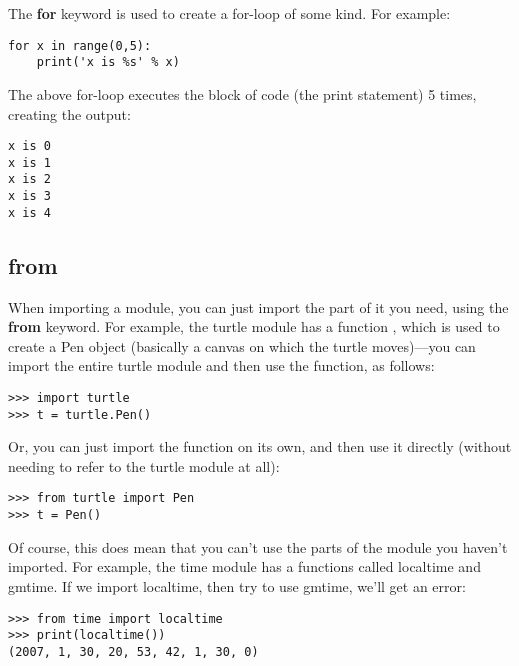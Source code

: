 The \textbf{for} keyword is used to create a for-loop of some kind. For example:

\begin{Verbatim}[frame=single]
for x in range(0,5):
    print('x is %s' % x)
\end{Verbatim}

\noindent
The above for-loop executes the block of code (the print statement) 5 times, creating the output:

\begin{Verbatim}[frame=single]
x is 0
x is 1
x is 2
x is 3
x is 4
\end{Verbatim}

\subsection*{from}

When importing a module, you can just import the part of it you need, using the \textbf{from} keyword. For example, the turtle module has a function , which is used to create a Pen object (basically a canvas on which the turtle moves)---you can import the entire turtle module and then use the  function, as follows:

\begin{Verbatim}[frame=single]
>>> import turtle
>>> t = turtle.Pen()
\end{Verbatim}

Or, you can just import the  function on its own, and then use it directly (without needing to refer to the turtle module at all):

\begin{Verbatim}[frame=single]
>>> from turtle import Pen
>>> t = Pen()
\end{Verbatim}

Of course, this does mean that you can't use the parts of the module you haven't imported.  For example, the time module has a functions called localtime and gmtime.  If we import localtime, then try to use gmtime, we'll get an error:

\begin{Verbatim}[frame=single]
>>> from time import localtime
>>> print(localtime())
(2007, 1, 30, 20, 53, 42, 1, 30, 0)
\end{Verbatim}

